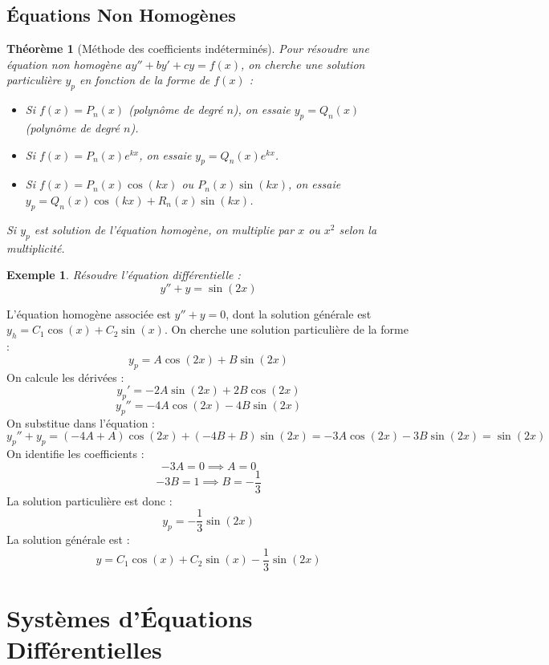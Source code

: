 \documentclass[12pt]{article}
\newtheorem{theorem}{Théorème}[section]
\newtheorem{example}{Exemple}[section]
\begin{document}
\subsection{Équations Non Homogènes}
\begin{theorem}[Méthode des coefficients indéterminés]
Pour résoudre une équation non homogène $a y'' + b y' + c y = f(x)$, on cherche une solution particulière $y_p$ en fonction de la forme de $f(x)$ :
\begin{itemize}
    \item Si $f(x) = P_n(x)$ (polynôme de degré $n$), on essaie $y_p = Q_n(x)$ (polynôme de degré $n$).
    \item Si $f(x) = P_n(x) e^{kx}$, on essaie $y_p = Q_n(x) e^{kx}$.
    \item Si $f(x) = P_n(x) \cos(kx)$ ou $P_n(x) \sin(kx)$, on essaie $y_p = Q_n(x) \cos(kx) + R_n(x) \sin(kx)$.
\end{itemize}
Si $y_p$ est solution de l'équation homogène, on multiplie par $x$ ou $x^2$ selon la multiplicité.
\end{theorem}

\begin{example}
Résoudre l'équation différentielle :
\[
y'' + y = \sin(2x)
\]
\end{example}

\begin{mybox}[Solution]
L'équation homogène associée est $y'' + y = 0$, dont la solution générale est $y_h = C_1 \cos(x) + C_2 \sin(x)$. On cherche une solution particulière de la forme :
\[
y_p = A \cos(2x) + B \sin(2x)
\]
On calcule les dérivées :
\[
y_p' = -2A \sin(2x) + 2B \cos(2x)
\]
\[
y_p'' = -4A \cos(2x) - 4B \sin(2x)
\]
On substitue dans l'équation :
\[
y_p'' + y_p = (-4A + A) \cos(2x) + (-4B + B) \sin(2x) = -3A \cos(2x) - 3B \sin(2x) = \sin(2x)
\]
On identifie les coefficients :
\[
-3A = 0 \implies A = 0
\]
\[
-3B = 1 \implies B = -\frac{1}{3}
\]
La solution particulière est donc :
\[
y_p = -\frac{1}{3} \sin(2x)
\]
La solution générale est :
\[
\boxed{y = C_1 \cos(x) + C_2 \sin(x) - \frac{1}{3} \sin(2x)}
\]
\end{mybox}

\section{Systèmes d'Équations Différentielles}
\end{document}
